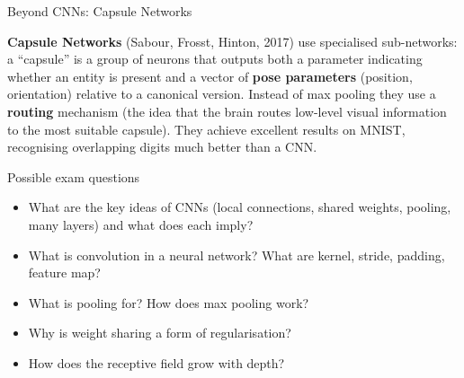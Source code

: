 \begin{boxnote}{Beyond CNNs: Capsule Networks}

\textbf{Capsule Networks} (Sabour, Frosst, Hinton, 2017) use
specialised sub-networks: a ``capsule'' is a group of neurons that
outputs both a parameter indicating whether an entity is present and a
vector of \textbf{pose parameters} (position, orientation) relative to
a canonical version. Instead of max pooling they use a \textbf{routing}
mechanism (the idea that the brain routes low-level visual information
to the most suitable capsule). They achieve excellent results on MNIST,
recognising overlapping digits much better than a CNN.

\end{boxnote}

\begin{boxquestion}{Possible exam questions}

\begin{itemize}
\tightlist
\item
  What are the key ideas of CNNs (local connections, shared weights,
  pooling, many layers) and what does each imply?
\item
  What is convolution in a neural network? What are kernel, stride,
  padding, feature map?
\item
  What is pooling for? How does max pooling work?
\item
  Why is weight sharing a form of regularisation?
\item
  How does the receptive field grow with depth?
\end{itemize}

\end{boxquestion}
